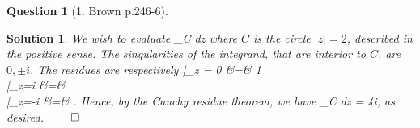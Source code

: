 \documentclass{article} %
\def\eQb#1\eQe{\begin{eqnarray*}#1\end{eqnarray*}}
\theoremstyle{quest}
\newtheorem*{question}{Question}
\newtheorem*{solution}{Solution}
\begin{document}
\begin{question}[1. Brown p.246-6]
\end{question}
\begin{solution}
We wish to evaluate 
\eQb
\int_{C}  dz
\eQe
where $C$ is the circle $|z| = 2$, described in the positive sense. 
The singularities of the integrand, that are interior to $C$,
are $0, \pm i$. The residues are respectively
\eQb
\dfrac{\cosh(\pi z)}{z^2 +1}|_{z = 0} &=& 1 \\
|_{z=i} &=&  \\
|_{z=-i} &=& .
\eQe 
Hence, by the Cauchy residue theorem, we have
\eQb
\int_{C}  dz = 4\pi i,
\eQe
as desired. $\qed$
\end{solution}
\end{document}
